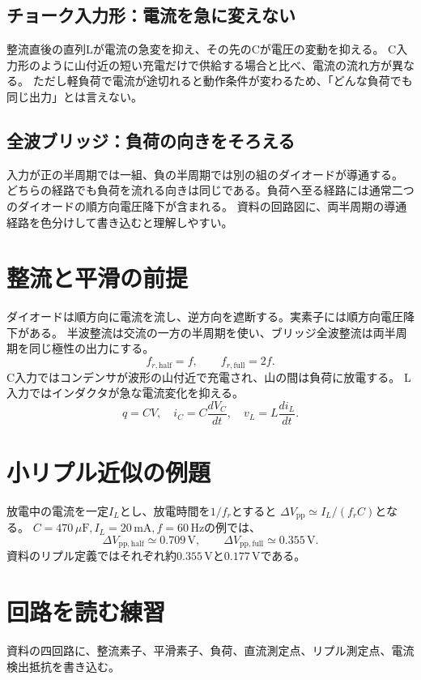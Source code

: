\documentclass[lualatex,a4paper,10pt]{jlreq}
\begin{document}
\subsection{チョーク入力形：電流を急に変えない}
整流直後の直列Lが電流の急変を抑え、その先のCが電圧の変動を抑える。
C入力形のように山付近の短い充電だけで供給する場合と比べ、電流の流れ方が異なる。
ただし軽負荷で電流が途切れると動作条件が変わるため、「どんな負荷でも同じ出力」とは言えない。
\clearpage
\subsection{全波ブリッジ：負荷の向きをそろえる}
入力が正の半周期では一組、負の半周期では別の組のダイオードが導通する。
どちらの経路でも負荷を流れる向きは同じである。負荷へ至る経路には通常二つのダイオードの順方向電圧降下が含まれる。
資料の回路図に、両半周期の導通経路を色分けして書き込むと理解しやすい。

\section{整流と平滑の前提}\label{sec:auto3}
ダイオードは順方向に電流を流し、逆方向を遮断する。実素子には順方向電圧降下がある。
半波整流は交流の一方の半周期を使い、ブリッジ全波整流は両半周期を同じ極性の出力にする。
\[
 f_{r,\mathrm{half}}=f,\qquad f_{r,\mathrm{full}}=2f.
\]
C入力ではコンデンサが波形の山付近で充電され、山の間は負荷に放電する。
L入力ではインダクタが急な電流変化を抑える。
\[
 q=CV,\quad i_C=C\frac{dV_C}{dt},\quad v_L=L\frac{di_L}{dt}.
\]
\section{小リプル近似の例題}\label{sec:auto4}
放電中の電流を一定$I_L$とし、放電時間を$1/f_r$とすると
$\Delta V_{\mathrm{pp}}\simeq I_L/(f_rC)$となる。
$C=470\,\mu\mathrm{F},I_L=20\,\mathrm{mA},f=60\,\mathrm{Hz}$の例では、
\[
 \Delta V_{\mathrm{pp,half}}\simeq0.709\,\mathrm{V},\qquad
 \Delta V_{\mathrm{pp,full}}\simeq0.355\,\mathrm{V}.
\]
資料のリプル定義ではそれぞれ約$0.355\,\mathrm{V}$と$0.177\,\mathrm{V}$である。
\section{回路を読む練習}\label{sec:auto5}
資料の四回路に、整流素子、平滑素子、負荷、直流測定点、リプル測定点、電流検出抵抗を書き込む。
\writing{35mm}
\clearpage
\end{document}
